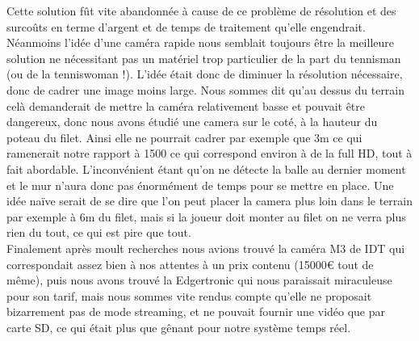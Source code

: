 Cette solution fût vite abandonnée à cause de ce problème de résolution et des surcoûts en terme d'argent et de temps de traitement qu'elle engendrait. Néanmoins l'idée d'une caméra rapide nous semblait toujours être la meilleure solution ne nécessitant pas un matériel trop particulier de la part du tennisman (ou de la tenniswoman !). L'idée était donc de diminuer la résolution nécessaire, donc de cadrer une image moins large. Nous sommes dit qu'au dessus du terrain celà demanderait de mettre la caméra relativement basse et pouvait être dangereux, donc nous avons étudié une camera sur le coté, à la hauteur du poteau du filet. Ainsi elle ne pourrait cadrer par exemple que 3m ce qui ramenerait notre rapport à 1500 ce qui correspond environ à de la full HD, tout à fait abordable. L'inconvénient étant qu'on ne détecte la balle au dernier moment et le mur n'aura donc pas énormément de temps pour se mettre en place. Une idée naïve serait de se dire que l'on peut placer la camera plus loin dans le terrain par exemple à 6m du filet, mais si la joueur doit monter au filet on ne verra plus rien du tout, ce qui est pire que tout.\\

Finalement après moult recherches nous avions trouvé la caméra M3 de IDT qui correspondait assez bien à nos attentes à un prix contenu (15000€ tout de même), puis nous avons trouvé la Edgertronic qui nous paraissait miraculeuse pour son tarif, mais nous sommes vite rendus compte qu'elle ne proposait bizarrement pas de mode streaming, et ne pouvait fournir une vidéo que par carte SD, ce qui était plus que gênant pour notre système temps réel.\\

